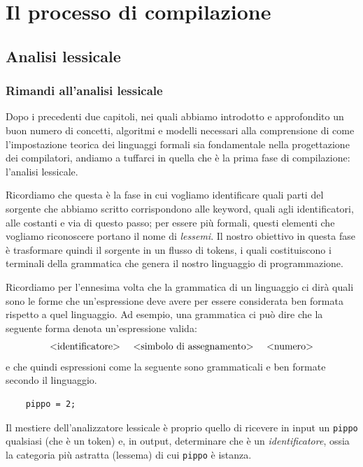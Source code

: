 \documentclass[class=book, crop=false, oneside, 12pt]{standalone}
\begin{document}
\part{Il processo di compilazione}
\chapter{Analisi lessicale}

\section{Rimandi all'analisi lessicale}
Dopo i precedenti due capitoli, nei quali abbiamo introdotto e approfondito un buon numero di concetti, algoritmi e modelli necessari alla comprensione di come l'impostazione teorica dei linguaggi formali sia fondamentale nella progettazione dei compilatori, andiamo a tuffarci in quella che è la prima fase di compilazione: l'analisi lessicale.


Ricordiamo che questa è la fase in cui vogliamo identificare quali parti del sorgente che abbiamo scritto corrispondono alle keyword, quali agli identificatori, alle costanti e via di questo passo; per essere più formali, questi elementi che vogliamo riconoscere portano il nome di \emph{lessemi}. 
Il nostro obiettivo in questa fase è trasformare quindi il sorgente in un flusso di tokens, i quali costituiscono i terminali della grammatica che genera il nostro linguaggio di programmazione.

Ricordiamo per l'ennesima volta che la grammatica di un linguaggio ci dirà quali sono le forme che un'espressione deve avere per essere considerata ben formata rispetto a quel linguaggio. Ad esempio, una grammatica ci può dire che la seguente forma denota un'espressione valida:
\begin{equation*}
    \textrm{<identificatore> \quad <simbolo di assegnamento> \quad <numero>}
\end{equation*}
e che quindi espressioni come la seguente sono grammaticali e ben formate secondo il linguaggio.\\
\begin{verbatim}
    pippo = 2;
\end{verbatim}
Il mestiere dell'analizzatore lessicale è proprio quello di ricevere in input un \texttt{pippo} qualsiasi (che è un token) e, in output, determinare che è un \emph{identificatore}, ossia la categoria più astratta (lessema) di cui \texttt{pippo} è istanza.
\end{document}
